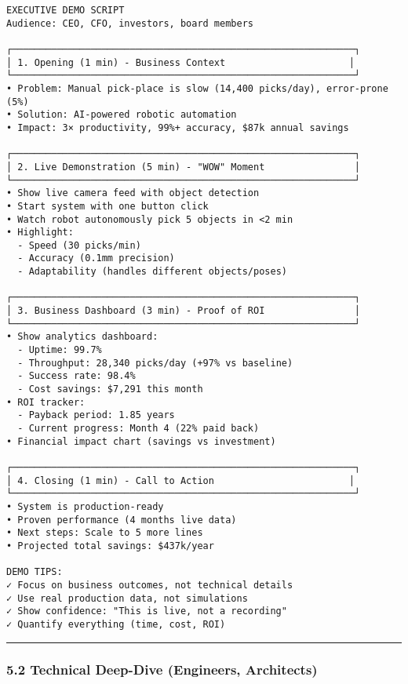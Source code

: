 \documentclass[
]{article}
\begin{document}
\begin{verbatim}
EXECUTIVE DEMO SCRIPT
Audience: CEO, CFO, investors, board members

┌─────────────────────────────────────────────────────────────┐
│ 1. Opening (1 min) - Business Context                      │
└─────────────────────────────────────────────────────────────┘
• Problem: Manual pick-place is slow (14,400 picks/day), error-prone (5%)
• Solution: AI-powered robotic automation
• Impact: 3× productivity, 99%+ accuracy, $87k annual savings

┌─────────────────────────────────────────────────────────────┐
│ 2. Live Demonstration (5 min) - "WOW" Moment                │
└─────────────────────────────────────────────────────────────┘
• Show live camera feed with object detection
• Start system with one button click
• Watch robot autonomously pick 5 objects in <2 min
• Highlight:
  - Speed (30 picks/min)
  - Accuracy (0.1mm precision)
  - Adaptability (handles different objects/poses)

┌─────────────────────────────────────────────────────────────┐
│ 3. Business Dashboard (3 min) - Proof of ROI                │
└─────────────────────────────────────────────────────────────┘
• Show analytics dashboard:
  - Uptime: 99.7%
  - Throughput: 28,340 picks/day (+97% vs baseline)
  - Success rate: 98.4%
  - Cost savings: $7,291 this month
• ROI tracker:
  - Payback period: 1.85 years
  - Current progress: Month 4 (22% paid back)
• Financial impact chart (savings vs investment)

┌─────────────────────────────────────────────────────────────┐
│ 4. Closing (1 min) - Call to Action                        │
└─────────────────────────────────────────────────────────────┘
• System is production-ready
• Proven performance (4 months live data)
• Next steps: Scale to 5 more lines
• Projected total savings: $437k/year

DEMO TIPS:
✓ Focus on business outcomes, not technical details
✓ Use real production data, not simulations
✓ Show confidence: "This is live, not a recording"
✓ Quantify everything (time, cost, ROI)
\end{verbatim}

\begin{center}\rule{0.5\linewidth}{0.5pt}\end{center}

\hypertarget{technical-deep-dive-engineers-architects}{%
\subsubsection{5.2 Technical Deep-Dive (Engineers,
Architects)}\label{technical-deep-dive-engineers-architects}}
\end{document}
